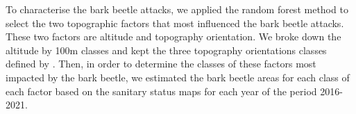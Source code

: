 \documentclass[3p,procedia]{elsarticle}
\begin{document}










To characterise the bark beetle attacks, we applied the random forest method to select the two topographic factors that most influenced the bark beetle attacks.
These two factors are altitude and topography orientation. We broke down the altitude by 100m classes and kept the three topography orientations classes defined by \cite{Delvaux_galoux}.
Then, in order to determine the classes of these factors most impacted by the bark beetle, we estimated the bark beetle areas for each class of each factor based on the sanitary status maps for each year of the period 2016-2021.

\end{document}
